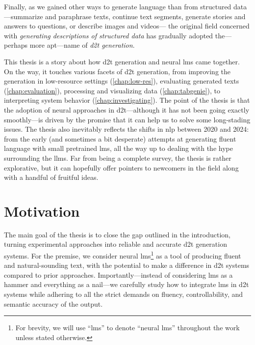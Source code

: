 Finally, as we gained other ways to generate language than from structured data---summarize and paraphrase texts, continue text segments, generate stories and answers to questions, or describe images and videos---%
the original field concerned with \textit{generating descriptions of structured data} has gradually adopted the---perhaps more apt---name of \emph{\ac{d2t} generation}.

This thesis is a story about how \acl{d2t} generation and neural \aclp{lm} came together. On the way, it touches various facets of \ac{d2t} generation, from improving the generation in low-resource settings (\autoref{chap:low-res}), evaluating generated texts (\autoref{chap:evaluation}), processing and visualizing data (\autoref{chap:tabgenie}), to interpreting system behavior (\autoref{chap:investigating}). The point of the thesis is that the adoption of neural approaches in \ac{d2t}---although it has not been going exactly smoothly---is driven by the promise that it can help us to solve some long-stading issues. The thesis also inevitably reflects the shifts in \ac{nlp} between 2020 and 2024: from the early (and sometimes a bit desperate) attempts at generating fluent language with small pretrained \acp{lm}, all the way up to dealing with the hype surrounding the \acp{llm}.  Far from being a complete survey, the thesis is rather explorative, but it can hopefully offer pointers to newcomers in the field along with a handful of fruitful ideas.










\section{Motivation}
\label{sec:rq}

The main goal of the thesis is to close the gap outlined in the introduction, turning experimental approaches into reliable and accurate \ac{d2t} generation systems. For the premise, we consider neural \acp{lm}\footnote{For brevity, we will use ``\acp{lm}'' to denote ``neural \acp{lm}'' throughout the work unless stated otherwise.} as a tool of producing fluent and natural-sounding text, with the potential to make a difference in \ac{d2t} systems compared to prior approaches. Importantly---instead of considering \acp{lm} as a hammer and everything as a nail---we carefully study how to integrate \acp{lm} in \ac{d2t} systems while adhering to all the strict demands on fluency, controllability, and semantic accuracy of the output.

